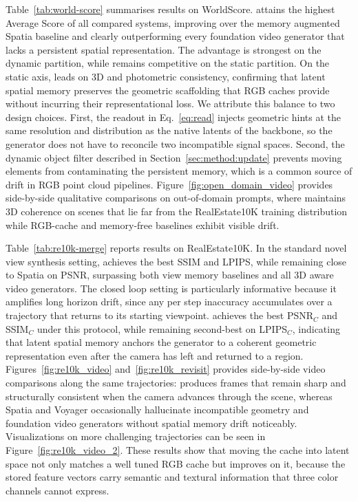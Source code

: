 Table~\ref{tab:world-score} summarises results on WorldScore. \method{} attains the highest Average Score of all compared systems, improving over the memory augmented Spatia baseline and clearly outperforming every foundation video generator that lacks a persistent spatial representation. The advantage is strongest on the dynamic partition, while \method{} remains competitive on the static partition. On the static axis, \method{} leads on 3D and photometric consistency, confirming that latent spatial memory preserves the geometric scaffolding that RGB caches provide without incurring their representational loss. We attribute this balance to two design choices. First, the readout in Eq.~\ref{eq:read} injects geometric hints at the same resolution and distribution as the native latents of the backbone, so the generator does not have to reconcile two incompatible signal spaces. Second, the dynamic object filter described in Section~\ref{sec:method:update} prevents moving elements from contaminating the persistent memory, which is a common source of drift in RGB point cloud pipelines. Figure~\ref{fig:open_domain_video} provides side-by-side qualitative comparisons on out-of-domain prompts, where \method{} maintains 3D coherence on scenes that lie far from the RealEstate10K training distribution while RGB-cache and memory-free baselines exhibit visible drift.

Table~\ref{tab:re10k-merge} reports results on RealEstate10K. In the standard novel view synthesis setting, \method{} achieves the best SSIM and LPIPS, while remaining close to Spatia on PSNR, surpassing both view memory baselines and all 3D aware video generators. The closed loop setting is particularly informative because it amplifies long horizon drift, since any per step inaccuracy accumulates over a trajectory that returns to its starting viewpoint. \method{} achieves the best PSNR$_C$ and SSIM$_C$ under this protocol, while remaining second-best on LPIPS$_C$, indicating that latent spatial memory anchors the generator to a coherent geometric representation even after the camera has left and returned to a region. Figures~\ref{fig:re10k_video} and~\ref{fig:re10k_revisit} provides side-by-side video comparisons along the same trajectories: \method{} produces frames that remain sharp and structurally consistent when the camera advances through the scene, whereas Spatia and Voyager occasionally hallucinate incompatible geometry and foundation video generators without spatial memory drift noticeably. Visualizations on more challenging trajectories can be seen in Figure~\ref{fig:re10k_video_2}. These results show that moving the cache into latent space not only matches a well tuned RGB cache but improves on it, because the stored feature vectors carry semantic and textural information that three color channels cannot express.


